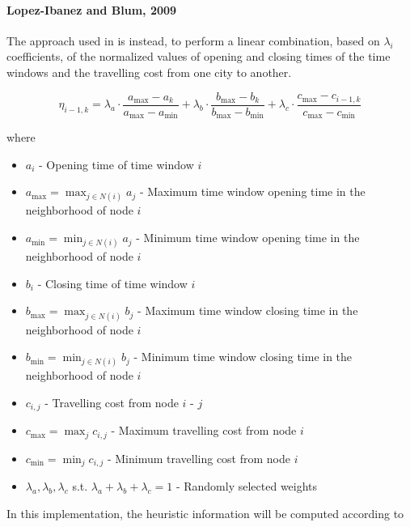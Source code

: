 \begin{homeworkProblem}
\paragraph{Lopez-Ibanez and Blum, 2009}
The approach used in \cite{lopez2010beam} is instead, to perform a linear combination, based on $\lambda_i$ coefficients, of the normalized values of opening and closing times of the time windows and the travelling cost from one city to another.

\begin{equation} \label{eq:heuristic}
\eta_{i-1,k} = \lambda_{a} \cdot \frac{a_{\max}-a_{k}}{a_{\max}-a_{\min}} + \lambda_{b} \cdot \frac{b_{\max}-b_{k}}{b_{\max}-b_{\min}} + \lambda_{c} \cdot \frac{c_{\max}-c_{i-1,k}}{c_{\max}-c_{\min}}
\end{equation}

where
\begin{itemize}
  \item $a_i$ - Opening time of time window $i$
  \item $a_{\max} = \max_{j \in N(i)} a_{j}$ - Maximum time window opening time in the neighborhood of node $i$
  \item $a_{\min} = \min_{j \in N(i)} a_{j}$ - Minimum time window opening time in the neighborhood of node $i$
  \item $b_i$ - Closing time of time window $i$
  \item $b_{\max} = \max_{j \in N(i)} b_{j}$ - Maximum time window closing time in the neighborhood of node $i$
  \item $b_{\min} = \min_{j \in N(i)} b_{j}$ - Minimum time window closing time in the neighborhood of node $i$
  \item $c_{i,j}$ - Travelling cost from node $i$ - $j$
  \item $c_{\max} = \max_j c_{i,j}$ - Maximum travelling cost from node $i$ 
  \item $c_{\min} = \min_j c_{i,j}$ - Minimum travelling cost from node $i$
  \item $\lambda_{a},\lambda_{b},\lambda_{c}$ s.t. $\lambda_{a}+\lambda_{b}+\lambda_{c}=1$ - Randomly selected weights
\end{itemize}

In this implementation, the heuristic information will be computed according to \cite{lopez2010beam}


\end{homeworkProblem}
